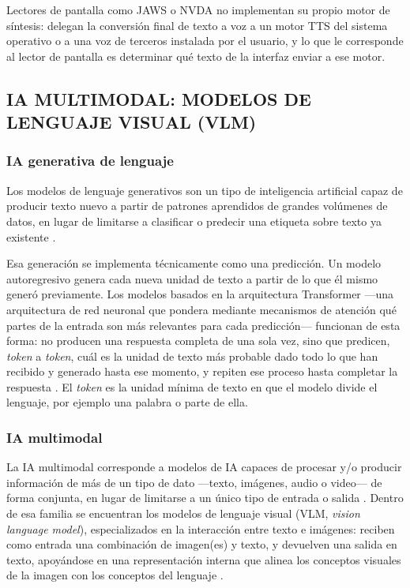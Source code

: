 Lectores de pantalla como JAWS o NVDA no implementan su propio motor de síntesis: delegan la conversión final de texto a voz a un motor TTS del sistema operativo o a una voz de terceros instalada por el usuario, y lo que le corresponde al lector de pantalla es determinar qué texto de la interfaz enviar a ese motor.

\subsection{IA MULTIMODAL: MODELOS DE LENGUAJE VISUAL (VLM)}

\subsubsection{IA generativa de lenguaje}

Los modelos de lenguaje generativos son un tipo de inteligencia artificial capaz de producir texto nuevo a partir de patrones aprendidos de grandes volúmenes de datos, en lugar de limitarse a clasificar o predecir una etiqueta sobre texto ya existente \cite{ibmgenpredictive}.

Esa generación se implementa técnicamente como una predicción. Un modelo autoregresivo genera cada nueva unidad de texto a partir de lo que él mismo generó previamente. Los modelos basados en la arquitectura Transformer —una arquitectura de red neuronal que pondera mediante mecanismos de atención qué partes de la entrada son más relevantes para cada predicción— funcionan de esta forma: no producen una respuesta completa de una sola vez, sino que predicen, \textit{token} a \textit{token}, cuál es la unidad de texto más probable dado todo lo que han recibido y generado hasta ese momento, y repiten ese proceso hasta completar la respuesta \cite{vaswani2017attention}. El \textit{token} es la unidad mínima de texto en que el modelo divide el lenguaje, por ejemplo una palabra o parte de ella.

\subsubsection{IA multimodal}

La IA multimodal corresponde a modelos de IA capaces de procesar y/o producir información de más de un tipo de dato —texto, imágenes, audio o video— de forma conjunta, en lugar de limitarse a un único tipo de entrada o salida \cite{wu2023multimodalsurvey}. Dentro de esa familia se encuentran los modelos de lenguaje visual (VLM, \textit{vision language model}), especializados en la interacción entre texto e imágenes: reciben como entrada una combinación de imagen(es) y texto, y devuelven una salida en texto, apoyándose en una representación interna que alinea los conceptos visuales de la imagen con los conceptos del lenguaje \cite{wu2023multimodalsurvey}.

